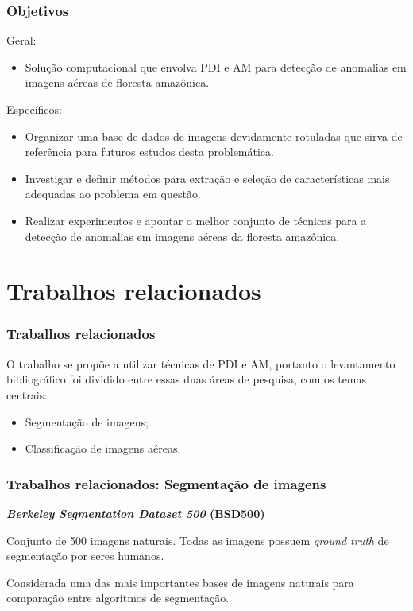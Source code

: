 \documentclass[t]{beamer}
\begin{document}
\begin{frame}
\frametitle{Objetivos}

Geral:

\begin{itemize}
	\item Solução computacional que envolva PDI e AM para detecção de anomalias em imagens aéreas de floresta amazônica.
\end{itemize}

Específicos:

\begin{itemize}
    \item Organizar uma base de dados de imagens devidamente rotuladas que sirva de referência para futuros estudos desta problemática.
    \item Investigar e definir métodos para extração e seleção de características mais adequadas ao problema em questão.
    \item Realizar experimentos e apontar o melhor conjunto de técnicas para a detecção de anomalias em imagens aéreas da floresta amazônica.
\end{itemize}

\end{frame}


\section{Trabalhos relacionados}

\begin{frame}
	\frametitle{Trabalhos relacionados}
	
	O trabalho se propõe a utilizar técnicas de PDI e AM, portanto o levantamento bibliográfico foi dividido entre essas duas áreas de pesquisa, com os temas centrais:
	
	\vspace{0.5cm}
	
	\begin{itemize}
		\item Segmentação de imagens;
		\item Classificação de imagens aéreas.
	\end{itemize}
	
\end{frame}

\begin{frame}
	\frametitle{Trabalhos relacionados: Segmentação de imagens}
	
	\textbf{\textit{Berkeley Segmentation Dataset 500} (BSD500)}
	
	\vspace{.5cm}
		
	Conjunto de 500 imagens naturais. Todas as imagens possuem \textit{ground truth} de segmentação por seres humanos.
	
	\vspace{.5cm}
	
	Considerada uma das mais importantes bases de imagens naturais para comparação entre algoritmos de segmentação.

\end{frame}
\end{document}
